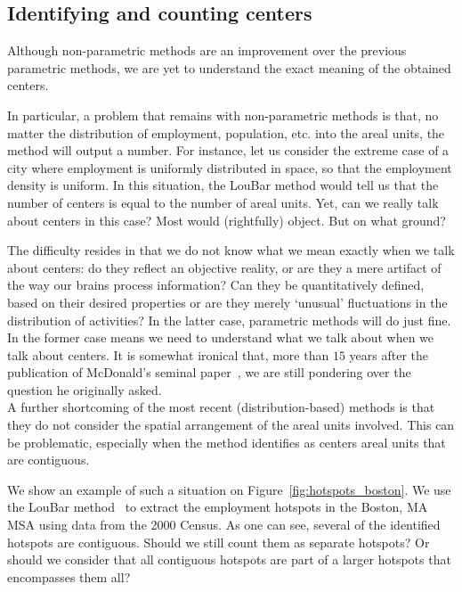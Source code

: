\subsection{Identifying and counting centers}
\label{sub:measuring_the_number_of_centers}

Although non-parametric methods are an improvement over the previous parametric
methods, we are yet to understand the exact meaning of the obtained centers. 


In particular, a problem that remains with non-parametric methods is that, no
matter the distribution of employment, population, etc. into the areal units,
the method will output a number. For instance, let us consider the extreme case
of a city where employment is uniformly distributed in space, so that the
employment density is uniform. In this situation, the LouBar method would tell
us that the number of centers is equal to the number of areal units. Yet, can we
really talk about centers in this case? Most would (rightfully) object. But on
what ground?

The difficulty resides in that we do not know what we mean exactly when we talk
about centers: do they reflect an objective reality, or are they a mere artifact
of the way our brains process information? Can they be quantitatively defined,
based on their desired properties or are they merely `unusual'
fluctuations in the distribution of activities? In the latter case, parametric
methods will do just fine. In the former case means we need to understand
what we talk about when we talk about centers. It is somewhat ironical that, more than $15$ years
after the publication of McDonald's seminal paper~\cite{McDonald:1987}, we are
still pondering over the question he originally asked.\\


A further shortcoming of the most recent (distribution-based) methods is that
they do not consider the spatial arrangement of the areal units involved. This
can be problematic, especially when the method identifies as centers areal units
that are contiguous. 

We show an example of such a situation on Figure~\ref{fig:hotspots_boston}. We use
the LouBar method~\cite{Louail:2014} to extract the employment hotspots in the
Boston, MA MSA using data from the 2000 Census. As one can see, several of the
identified hotspots are contiguous. Should we still count them as separate
hotspots? Or should we consider that all contiguous hotspots are part of a
larger hotspots that encompasses them all?\\

